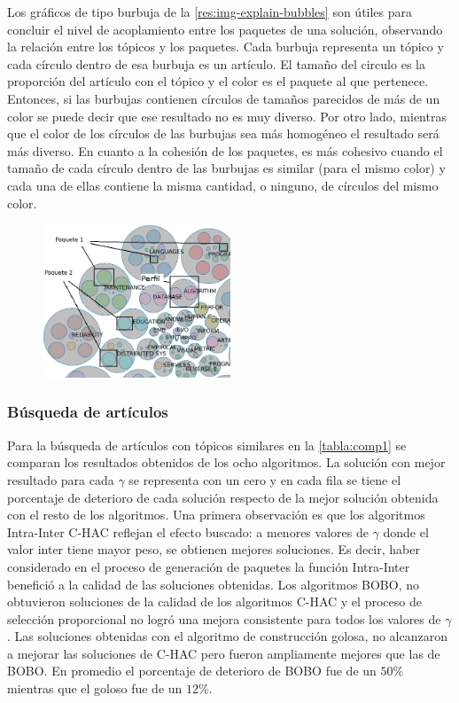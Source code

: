 Los gráficos de tipo burbuja de la \autoref{res:img-explain-bubbles} son útiles para concluir el nivel de acoplamiento entre los paquetes de una solución, observando la relación entre los tópicos y los paquetes. Cada burbuja representa un tópico y cada círculo dentro de esa burbuja es un artículo. El tamaño del circulo es la proporción del artículo con el tópico y el color es el paquete al que pertenece. Entonces, si las burbujas contienen círculos de tamaños parecidos de más de un color se puede decir que ese resultado no es muy diverso. Por otro lado, mientras que el color de los círculos de las burbujas sea más homogéneo el resultado será más diverso. En cuanto a la cohesión de los paquetes, es más cohesivo cuando el tamaño de cada círculo dentro de las burbujas es similar (para el mismo color) y cada una de ellas contiene la misma cantidad, o ninguno, de círculos del mismo color.

\begin{figure}[H]
  \centering
    \includegraphics[width=0.5\textwidth]{img/explain-bubbles.png}
  \caption{}
  \label{res:img-explain-bubbles}
\end{figure}

\subsubsection{Búsqueda de artículos}
Para la búsqueda de artículos con tópicos similares en la \autoref{tabla:comp1} se comparan los resultados obtenidos de los ocho algoritmos. La solución con mejor resultado para cada $\gamma$ se representa con un cero y en cada fila se tiene el porcentaje de deterioro de cada solución respecto de la mejor solución obtenida con el resto de los algoritmos. Una primera observación es que los algoritmos Intra-Inter C-HAC reflejan el efecto buscado: a menores valores de $\gamma$ donde el valor inter tiene mayor peso, se obtienen mejores soluciones. Es decir, haber considerado en el proceso de generación de paquetes la función Intra-Inter benefició a la calidad de las soluciones obtenidas. Los algoritmos BOBO, no obtuvieron soluciones de la calidad de los algoritmos C-HAC y el proceso de selección proporcional no logró una mejora consistente para todos los valores de $\gamma$. Las soluciones obtenidas con el algoritmo de construcción golosa, no alcanzaron a mejorar las soluciones de C-HAC pero fueron ampliamente mejores que las de BOBO. En promedio el porcentaje de deterioro de BOBO fue de un $50\%$ mientras que el goloso fue de un $12\%$. 


